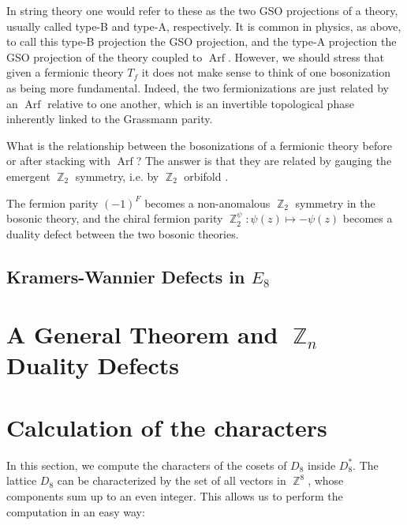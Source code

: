 \documentclass{article}
\DeclareMathOperator{\bbZ}{\mathbb{Z}}
\DeclareMathOperator{\Arf}{\textrm{Arf}}
\begin{document}
In string theory one would refer to these as the two GSO projections of a theory, usually called type-B and type-A, respectively. It is common in physics, as above, to call this type-B projection the GSO projection, and the type-A projection the GSO projection of the theory coupled to $\Arf$. However, we should stress that given a fermionic theory $T_f$ it does not make sense to think of one bosonization as being more fundamental. Indeed, the two fermionizations are just related by an $\Arf$ relative to one another, which is an invertible topological phase inherently linked to the Grassmann parity.

What is the relationship between the bosonizations of a fermionic theory before or after stacking with $\Arf$? The answer is that they are related by gauging the emergent $\bbZ_2$ symmetry, i.e. by $\bbZ_2$ orbifold \cite{karchTongTurner:webOf2d}. 

The fermion parity $(-1)^F$ becomes a non-anomalous $\bbZ_2$ symmetry in the bosonic theory, and the chiral fermion parity $\bbZ_2^\psi: \psi(z)\mapsto -\psi(z)$ becomes a duality defect between the two bosonic theories.


\subsection{Kramers-Wannier Defects in \texorpdfstring{$E_8$}{E8}}

\section{A General Theorem and \texorpdfstring{$\bbZ_n$}{Zn} Duality Defects}

\newpage

\appendix

\section{Calculation of the characters}

In this section, we compute the characters of the cosets of $D_8$ inside $D_8^*$. The lattice $D_8$ can be characterized by the set of all vectors in $\bbZ^8$, whose components sum up to an even integer. This allows us to perform the computation in an easy way:
\end{document}
